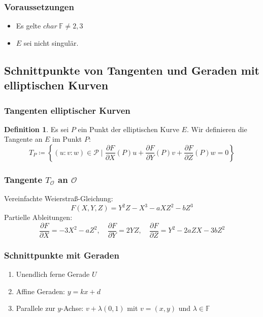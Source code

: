 \documentclass{beamer}
\theoremstyle{plain}
\theoremstyle{definition}
\newtheorem{defn}[thm]{Definition}
\theoremstyle{rem}
\newcommand{\patinf}{\mathcal{O}}
\begin{document}
\begin{frame}
\frametitle{Voraussetzungen}
\begin{itemize}
    \item Es gelte $char\ \mathbb{F}\ne2,3$
    \item $E$ sei nicht singulär.
\end{itemize}
\end{frame}

\subsection{Schnittpunkte von Tangenten und Geraden  mit elliptischen Kurven}

\begin{frame}
    \frametitle{Tangenten elliptischer Kurven}
    \begin{defn}
        Es sei $P$ ein Punkt der elliptischen Kurve $E$. Wir definieren die Tangente an $E$ im Punkt $P$:
        \begin{equation*}
            T_P\coloneqq\left\{(u:v:w)\in\mathcal{P}\mid\frac{\partial F}{\partial X}(P)u+\frac{\partial F}{\partial Y}(P)v+\frac{\partial F}{\partial Z}(P)w=0\right\}
        \end{equation*}
    \end{defn}
\end{frame}

\begin{frame}
	\frametitle{Tangente $T_{\mathcal{O}}$ an $\patinf$}
Vereinfachte Weierstraß-Gleichung:
    \begin{equation*}
	F(X,Y,Z)=Y^2Z - X^3 - aXZ^2 - bZ^3
    \end{equation*}
    Partielle Ableitungen:
\begin{equation*}
        \frac{\partial F}{\partial X}=-3X^2-aZ^2,\quad \frac{\partial F}{\partial Y}=2YZ,\quad \frac{\partial F}{\partial Z}=Y^2-2aZX-3bZ^2
    \end{equation*}
\end{frame}

\begin{frame}
    \frametitle{Schnittpunkte mit Geraden}
    \begin{enumerate}[<+->]
        \item Unendlich ferne Gerade $U$
        \item Affine Geraden: $y = kx +d$
        \item Parallele zur $y$-Achse: $v + \lambda (0,1)$ mit $v=(x,y)$ und $\lambda \in \mathbb{F}$
    \end{enumerate}
\end{frame}
\end{document}
